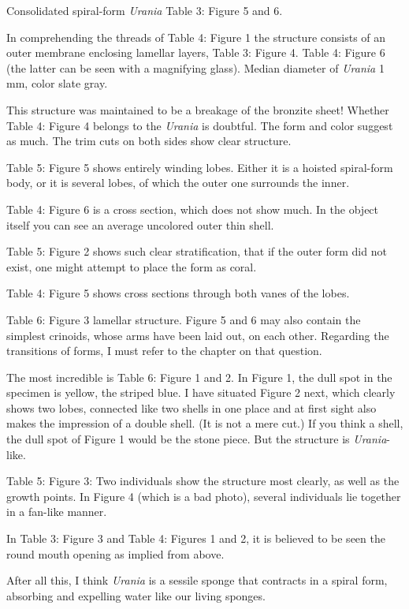 \documentclass[a4paper, 12pt, oneside]{article}
\begin{document}
Consolidated spiral-form \emph{Urania} Table 3: Figure 5 and 6.

In comprehending the threads of Table 4: Figure 1 the structure consists of an outer membrane enclosing lamellar layers, Table 3: Figure 4. Table 4: Figure 6 (the latter can be seen with a magnifying glass). Median diameter of \emph{Urania} 1 mm, color slate gray.

This structure was maintained to be a breakage of the bronzite sheet! Whether Table 4: Figure 4 belongs to the \emph{Urania} is doubtful. The form and color suggest as much. The trim cuts on both sides show clear structure.

Table 5: Figure 5 shows entirely winding lobes. Either it is a hoisted spiral-form body, or it is several lobes, of which the outer one surrounds the inner.

Table 4: Figure 6 is a cross section, which does not show much. In the object itself you can see an average uncolored outer thin shell.

Table 5: Figure 2 shows such clear stratification, that if the outer form did not exist, one might attempt to place the form as coral.

Table 4: Figure 5 shows cross sections through both vanes of the lobes.

Table 6: Figure 3 lamellar structure. Figure 5 and 6 may also contain the simplest crinoids, whose arms have been laid out, on each other. Regarding the transitions of forms, I must refer to the chapter on that question.

The most incredible is Table 6: Figure 1 and 2. In Figure 1, the dull spot in the specimen is yellow, the striped blue. I have situated Figure 2 next, which clearly shows two lobes, connected like two shells in one place and at first sight also makes the impression of a double shell. (It is not a mere cut.) If you think a shell, the dull spot of Figure 1 would be the stone piece. But the structure is \emph{Urania}-like.

Table 5: Figure 3: Two individuals show the structure most clearly, as well as the growth points. In Figure 4 (which is a bad photo), several individuals lie together in a fan-like manner.

In Table 3: Figure 3 and Table 4: Figures 1 and 2, it is believed to be seen the round mouth opening as implied from above.

After all this, I think \emph{Urania} is a sessile sponge that contracts in a spiral form, absorbing and expelling water like our living sponges.
\end{document}
